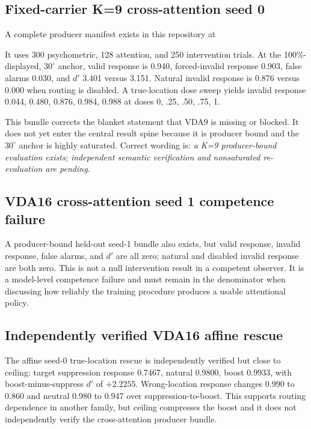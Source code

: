 \documentclass[11pt]{article}
\begin{document}
\subsection{Fixed-carrier K=9 cross-attention seed 0}
A complete producer manifest exists in this repository at
\begin{quote}\footnotesize
{}
\end{quote}
It uses 300 psychometric, 128 attention, and 250 intervention trials. At the 100\%-displayed, $30^\circ$ anchor, valid response is 0.940, forced-invalid response 0.903, false alarms 0.030, and $d'$ 3.401 versus 3.151. Natural invalid response is 0.876 versus 0.000 when routing is disabled. A true-location dose sweep yields invalid response 0.044, 0.480, 0.876, 0.984, 0.988 at doses 0, .25, .50, .75, 1.

This bundle corrects the blanket statement that VDA9 is missing or blocked. It does not yet enter the central result spine because it is producer bound and the $30^\circ$ anchor is highly saturated. Correct wording is: \emph{a K=9 producer-bound evaluation exists; independent semantic verification and nonsaturated re-evaluation are pending}.

\subsection{VDA16 cross-attention seed 1 competence failure}
A producer-bound held-out seed-1 bundle also exists, but valid response, invalid response, false alarms, and $d'$ are all zero; natural and disabled invalid response are both zero. This is not a null intervention result in a competent observer. It is a model-level competence failure and must remain in the denominator when discussing how reliably the training procedure produces a usable attentional policy.

\subsection{Independently verified VDA16 affine rescue}
The affine seed-0 true-location rescue is independently verified but close to ceiling: target suppression response 0.7467, natural 0.9800, boost 0.9933, with boost-minus-suppress $d'$ of $+2.2255$. Wrong-location response changes 0.990 to 0.860 and neutral 0.980 to 0.947 over suppression-to-boost. This supports routing dependence in another family, but ceiling compresses the boost and it does not independently verify the cross-attention producer bundle.
\end{document}
